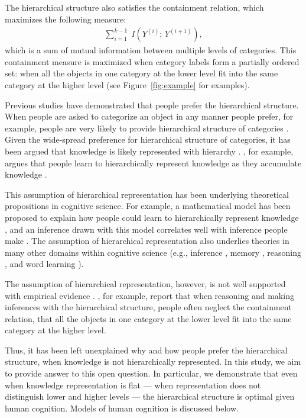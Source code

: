 \documentclass[doc]{apa6}
\begin{document}
The hierarchical structure also satisfies the containment relation, which maximizes the following
measure:
\begin{align}
    \sum_{i=1}^{k-1} \; I \left( Y^{(i)};\, Y^{(i + 1)} \right),
\label{eqn:containment}
\end{align}
which is a sum of mutual information between multiple levels of categories. This containment measure
is maximized when category labels form a partially ordered set: when all the objects in one category
at the lower level fit into the same category at the higher level (see Figure~\ref{fig:example} for
examples).

Previous studies have demonstrated that people prefer the hierarchical structure.  When people are
asked to categorize an object in any manner people prefer, for example, people are very likely to
provide hierarchical structure of categories \parencite[e.g.,][]{Rosch1976a}.  Given the wide-spread
preference for hierarchical structure of categories, it has been argued that knowledge is likely
represented with hierarchy \parencite[e.g.,][]{Markman1984a, Markman1989a}.
\textcite{Markman1989a}, for example, argues that people learn to hierarchically represent knowledge
as they accumulate knowledge \parencite[see also][]{Vygotsky1962a, Inhelder1964a}.

This assumption of hierarchical representation has been underlying theoretical propositions in
cognitive science. For example, a mathematical model has been proposed to explain how people could
learn to hierarchically represent knowledge \parencite{Kemp2008a}, and an inference drawn with this
model correlates well with inference people make \parencite{Kemp2009a}.  The assumption of
hierarchical representation also underlies theories in many other domains within cognitive science
(e.g., inference \parencite{Osherson1990a}, memory \parencite{Bower1969a, Glass1975a}, reasoning
\parencite{Collins1989a, Shastri1993a}, and word learning \parencite{Xu2007a}).

The assumption of hierarchical representation, however, is not well supported with empirical
evidence \parencite[see][for review]{Murphy1997a}. \textcite{Sloman1998a}, for example, report that
when reasoning and making inferences with the hierarchical structure, people often neglect the
containment relation, that all the objects in one category at the lower level fit into the same
category at the higher level.

Thus, it has been left unexplained why and how people prefer the hierarchical structure, when
knowledge is not hierarchically represented. In this study, we aim to provide answer to this open
question. In particular, we demonstrate that even when knowledge representation is flat --- when
representation does not distinguish lower and higher levels --- the hierarchical structure is
optimal given human cognition. Models of human cognition is discussed below.
\end{document}
